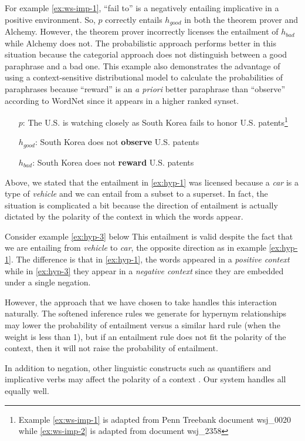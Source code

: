 For example \eqref{ex:ws-imp-1}, ``fail to'' is a negatively entailing
implicative in a positive environment.
So, $p$ correctly entails $h_{good}$ in both the theorem prover and Alchemy. 
However, the theorem prover incorrectly licenses the entailment of $h_{bad}$
while Alchemy does not.  
The probabilistic approach performs better in this situation because the
categorial approach does not distinguish between a good paraphrase and a
bad one.  This example also demonstrates the advantage of using a
context-sensitive distributional model to calculate the probabilities of
paraphrases because ``reward'' is an {\it a priori} better paraphrase than
``observe'' according to WordNet since it appears in a higher ranked synset. 

\begin{covex}\label{ex:ws-imp-1}
\begin{itemize}
  \item[$p$:] The U.S. is watching closely as South Korea fails to honor
  U.S. patents\footnote{Example \eqref{ex:ws-imp-1} is adapted from Penn
  Treebank document wsj\_0020 while \eqref{ex:ws-imp-2} is adapted from document
  wsj\_2358}
  \item[$h_{good}$:] South Korea does not {\bf observe} U.S. patents
  \item[$h_{bad}$:] South Korea does not {\bf reward} U.S. patents
\end{itemize}
\end{covex}




Above, we stated that the entailment in \eqref{ex:hyp-1} was licensed because a
{\it car} is a type of {\it vehicle} and we can entail from a subset to a
superset.  In fact, the situation is complicated a bit because the direction of
entailment is actually dictated by the polarity of the context in which the
words appear.

Consider example \eqref{ex:hyp-3} below
This entailment is valid despite the fact that we are entailing from {\it
vehicle} to {\it car}, the opposite direction as in example \eqref{ex:hyp-1}. 
The difference is that in \eqref{ex:hyp-1}, the words appeared in a {\it
positive context} while in \eqref{ex:hyp-3} they appear in a {\it
negative context} since they are embedded under a single negation.

However, the approach that we have chosen to take handles this interaction
naturally.  The softened inference rules we generate for hypernym relationships
may lower the probability of entailment versus a similar hard rule (when the
weight is less than 1), but if an entailment rule does not fit the polarity of
the context, then it will not raise the probability of entailment.

In addition to negation, other linguistic constructs such as quantifiers and
implicative verbs may affect the polarity of a context
\citep{maccartney:iwcs2009}.  Our system handles all equally well.

